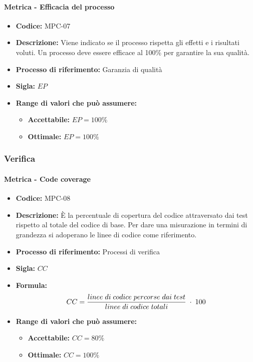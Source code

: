     \paragraph{Metrica - Efficacia del processo}
    \begin{itemize}
        \item \textbf{Codice:} MPC-07
        \item \textbf{Descrizione:} Viene indicato se il processo rispetta gli effetti e i risultati voluti. Un processo deve essere efficace al 100\% per garantire la sua qualità.
        \item \textbf{Processo di riferimento:} Garanzia di qualità
        \item \textbf{Sigla:} $EP$
        \item \textbf{Range di valori che può assumere:}
        \begin{itemize}
            \item \textbf{Accettabile:} $EP = 100\%$
            \item \textbf{Ottimale:} $EP = 100\%$
        \end{itemize}
    \end{itemize}

\subsubsection{Verifica}
    \paragraph{Metrica - Code coverage}
    \begin{itemize}
        \item \textbf{Codice:} MPC-08
        \item \textbf{Descrizione:} È la percentuale di copertura del codice attraversato dai test rispetto al totale del codice di base. Per dare una misurazione in termini di grandezza si adoperano le linee di codice come riferimento.
        \item \textbf{Processo di riferimento:} Processi di verifica
        \item \textbf{Sigla:} $CC$
        \item \textbf{Formula:} $$CC = {linee \; di \; codice \; percorse \; dai  \; test \over linee \; di \; codice \; totali} \; \cdot \; 100$$
        \item \textbf{Range di valori che può assumere:}
        \begin{itemize}
            \item \textbf{Accettabile:} $CC = 80\%$
            \item \textbf{Ottimale:} $CC = 100\%$
        \end{itemize}
    \end{itemize}

